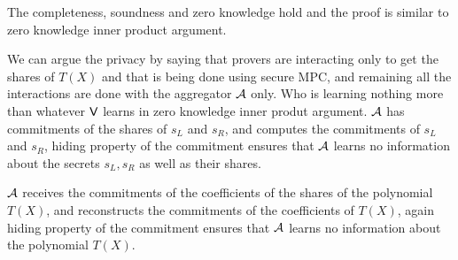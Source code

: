 \begin{comment}
\subsubsection{Completeness} Consider the provers are honest i.e. $\cP_1,\ldots, \cP_N$ together hold the witness i.e. equation (5) is true, then the checks succeed. We will see one by one how all the checks succeed.\\
The first check succeeds because:
\begin{align*}
	h^{\tau_x}g^{\hat{t}} &= h^{\delta+\tau_1 x+ \tau_2 x^2}\cdot g^{\langle \bm{a},\bm{b}\rangle + t_1x+t_2x^2}\\
	&= h^{\sum\limits_{i=1}^N(\delta_i+\tau^i_1x+\tau^i_2x^2)}\cdot g^{\sum\limits_{i=1}^N (t^i_0+t^i_1x+t^i_2x^2)}\\
	&= \prod\limits_{i=1}^N h^{\delta_i}.h^{\tau^i_1x}.h^{\tau^i_2x^2}\prod\limits_{i=1}^N g^{t_0}.g^{t^i_1x}.g^{t^i_2x^2}\\
	&= (h^{\delta}\cdot g^{\langle \bm{a},\bm{b}\rangle})\cdot(h^{\tau_1}g^{t_1})^x\cdot(h^{\tau_2}g^{t_2})^{x^2}\\
	&= V\cdot T_1^x \cdot T_2^{x^2}
\end{align*} 
The second check succeeds because:
\begin{align*}
	P\cdot S^x &= h^{\sigma}\bm{g}^{\bm{a}}\bm{h}^{\bm{b}}\cdot (h^{\rho}\bm{g}^{\bm{s}_L}\bm{h}^{\bm{s}_R})^x\\
	&= h
\end{align*}
\subsubsection{Soundness}
\end{comment}
The completeness, soundness and zero knowledge hold and the proof is similar to zero knowledge inner product argument.

We can argue the privacy by saying that provers are interacting only to get the shares of $T(X)$ and that is being done using secure MPC, and remaining all the interactions are done with the aggregator ${\cal A}$ only. Who is learning nothing more than whatever $\mathsf{V}$ learns in zero knowledge inner produt argument. 
${\cal A}$ has commitments of the shares of $s_L$ and $s_R$, and computes the commitments of $s_L$ and $s_R$, hiding property of the commitment ensures that ${\cal A}$ learns no information about the secrets $s_L, s_R$ as well as their shares.

${\cal A}$ receives the commitments of the coefficients of the shares of the polynomial $T(X)$, and reconstructs the commitments of the coefficients of $T(X)$, again hiding property of the commitment ensures that ${\cal A}$ learns no information about the polynomial $T(X)$.

